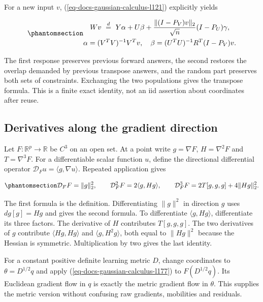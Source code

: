 \documentclass[
  11pt,
]{article}
\theoremstyle{definition}
\theoremstyle{plain}
\theoremstyle{plain}
\theoremstyle{plain}
\theoremstyle{remark}
\begin{document}
For a new input \(v\), (\ref{eq-docs-gaussian-calculus-l121}) explicitly
yields

\begin{equation}\protect\phantomsection\label{eq-docs-gaussian-calculus-l155}{
\begin{gathered}
Wv\ \overset d=\ Y\alpha+U\beta+
\frac{\|(I-P_V)v\|_2}{\sqrt n}(I-P_U)\gamma,
\\
\alpha=(V^TV)^{-1}V^Tv,\quad
\beta=(U^TU)^{-1}R^T(I-P_V)v.
\end{gathered}
}\end{equation}

The first response preserves previous forward answers, the second
restores the overlap demanded by previous transpose answers, and the
random part preserves both sets of constraints. Exchanging the two
populations gives the transpose formula. This is a finite exact
identity, not an iid assertion about coordinates after reuse.

\subsection{Derivatives along the gradient
direction}\label{sec-docs-gaussian-calculus-l170}

Let \(F:\mathbb{R}^p\to\mathbb{R}\) be \(C^3\) on an open set. At a
point write \(g=\nabla F\), \(H=\nabla^2F\) and \(T=\nabla^3F\). For a
differentiable scalar function \(u\), define the directional
differential operator \(\mathcal{D}_Fu=\langle g,\nabla u\rangle\).
Repeated application gives

\begin{equation}\protect\phantomsection\label{eq-docs-gaussian-calculus-l177}{
\mathcal D_F F=\|g\|_2^2,\qquad
\mathcal D_F^2F=2\langle g,Hg\rangle,\qquad
\mathcal D_F^3F=2T[g,g,g]+4\|Hg\|_2^2.
}\end{equation}

The first formula is the definition. Differentiating
\(\lVert g\rVert^2\) in direction \(g\) uses \(dg[g]=Hg\) and gives the
second formula. To differentiate \(\langle g,Hg\rangle\), differentiate
its three factors. The derivative of \(H\) contributes \(T[g,g,g]\). The
two derivatives of \(g\) contribute \(\langle Hg,Hg\rangle\) and
\(\langle g,H^2g\rangle\), both equal to \(\lVert Hg\rVert^2\) because
the Hessian is symmetric. Multiplication by two gives the last identity.

For a constant positive definite learning metric \(D\), change
coordinates to \(\theta=D^{1/2}q\) and apply
(\ref{eq-docs-gaussian-calculus-l177}) to \(F(D^{1/2}q)\). Its Euclidean
gradient flow in \(q\) is exactly the metric gradient flow in
\(\theta\). This supplies the metric version without confusing raw
gradients, mobilities and residuals.
\end{document}
